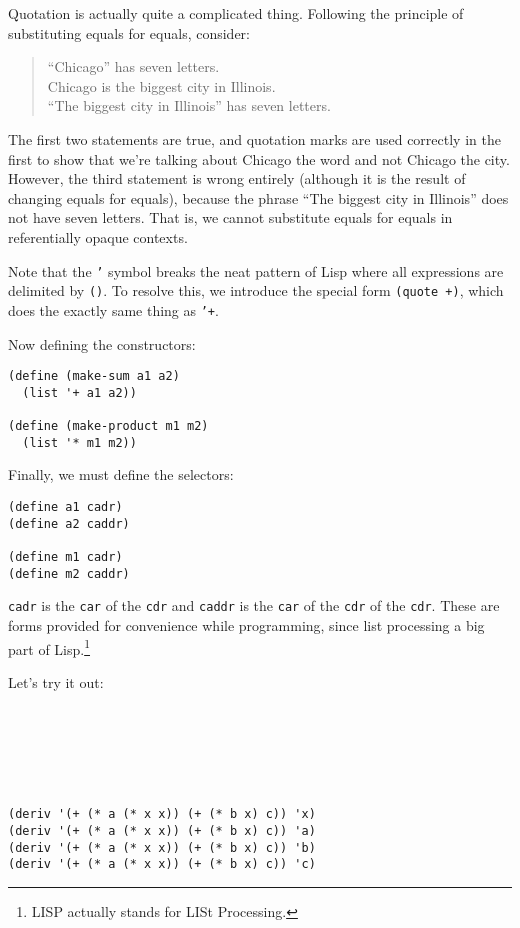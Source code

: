 \documentclass[9pt]{report}
\begin{document}
Quotation is actually quite a complicated thing. Following the
principle of substituting equals for equals, consider:

\begin{verse}
``Chicago'' has seven letters.\\
Chicago is the biggest city in Illinois.\\
``The biggest city in Illinois'' has seven letters.\\
\end{verse}

The first two statements are true, and quotation marks are used
correctly in the first to show that we're talking about Chicago
the word and not Chicago the city. However, the third statement is
wrong entirely (although it is the result of changing equals for
equals), because the phrase ``The biggest city in Illinois'' does
not have seven letters.
That is, we cannot substitute equals for equals in referentially
opaque contexts.

Note that the \texttt{'} symbol breaks the neat pattern of Lisp where all
expressions are delimited by \texttt{()}. To resolve this, we introduce
the special form \texttt{(quote +)}, which does the exactly same thing as
\texttt{'+}.

Now defining the constructors:

\begin{verbatim}
(define (make-sum a1 a2)
  (list '+ a1 a2))

(define (make-product m1 m2)
  (list '* m1 m2))
\end{verbatim}


Finally, we must define the selectors:

\begin{verbatim}
(define a1 cadr)
(define a2 caddr)

(define m1 cadr)
(define m2 caddr)
\end{verbatim}


\texttt{cadr} is the \texttt{car} of the \texttt{cdr} and \texttt{caddr} is the \texttt{car} of the
\texttt{cdr} of the \texttt{cdr}. These are forms provided for convenience while
programming, since list processing a big part of Lisp.\footnote{LISP actually stands for LISt Processing.}

Let's try it out:

\begin{verbatim}






(deriv '(+ (* a (* x x)) (+ (* b x) c)) 'x)
(deriv '(+ (* a (* x x)) (+ (* b x) c)) 'a)
(deriv '(+ (* a (* x x)) (+ (* b x) c)) 'b)
(deriv '(+ (* a (* x x)) (+ (* b x) c)) 'c)
\end{verbatim}
\end{document}
